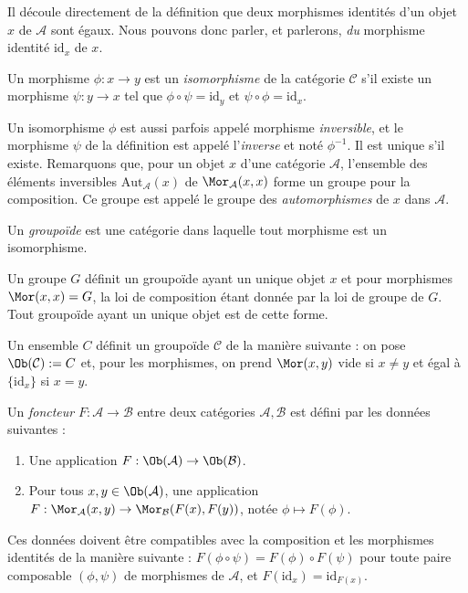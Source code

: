 \begin{remark}
\label{remark-unique-identity}
Il découle directement de la définition que deux morphismes identités
d'un objet $x$ de $\mathcal{A}$ sont égaux. Nous pouvons donc parler,
et parlerons, {\it du} morphisme identité $\text{id}_x$ de $x$.
\end{remark}

\begin{definition}
\label{definition-isomorphism}
Un morphisme $\phi : x \to y$ est un {\it isomorphisme} de la catégorie
$\mathcal{C}$ s'il existe un morphisme $\psi : y \to x$
tel que $\phi \circ \psi = \text{id}_y$ et
$\psi \circ \phi = \text{id}_x$.
\end{definition}

\noindent
Un isomorphisme $\phi$ est aussi parfois appelé morphisme
{\it inversible}, et le morphisme $\psi$ de la définition est appelé
l'{\it inverse} et noté $\phi^{-1}$. Il est unique s'il existe. Remarquons que,
pour un objet $x$ d'une catégorie $\mathcal{A}$, l'ensemble des éléments
inversibles $\text{Aut}_\mathcal{A}(x)$
de $\Mor_\mathcal{A}(x, x)$ forme un groupe pour la composition.
Ce groupe est appelé le groupe des {\it automorphismes} de $x$ dans
$\mathcal{A}$.

\begin{definition}
\label{definition-groupoid}
Un {\it groupoïde} est une catégorie dans laquelle tout morphisme est
un isomorphisme.
\end{definition}

\begin{example}
\label{example-group-groupoid}
Un groupe $G$ définit un groupoïde ayant un unique objet $x$
et pour morphismes $\Mor(x, x) = G$, la loi de composition
étant donnée par la loi de groupe de $G$. Tout groupoïde ayant un unique
objet est de cette forme.
\end{example}

\begin{example}
\label{example-set-groupoid}
Un ensemble $C$ définit un groupoïde $\mathcal{C}$ de la manière suivante :
on pose $\Ob(\mathcal{C}) := C$ et, pour les morphismes,
on prend $\Mor(x, y)$ vide si $x\neq y$ et égal à
$\{\text{id}_x\}$ si $x = y$.
\end{example}

\begin{definition}
\label{definition-functor}
Un {\it foncteur} $F : \mathcal{A} \to \mathcal{B}$
entre deux catégories $\mathcal{A}, \mathcal{B}$ est défini par les
données suivantes :
\begin{enumerate}
\item Une application $F : \Ob(\mathcal{A}) \to \Ob(\mathcal{B})$.
\item Pour tous $x, y \in \Ob(\mathcal{A})$, une application
$F : \Mor_\mathcal{A}(x, y) \to \Mor_\mathcal{B}(F(x), F(y))$,
notée $\phi \mapsto F(\phi)$.
\end{enumerate}
Ces données doivent être compatibles avec la composition et les morphismes
identités de la manière suivante : $F(\phi \circ \psi) =
F(\phi) \circ F(\psi)$ pour toute paire composable $(\phi, \psi)$ de
morphismes de $\mathcal{A}$, et $F(\text{id}_x) = \text{id}_{F(x)}$.
\end{definition}


